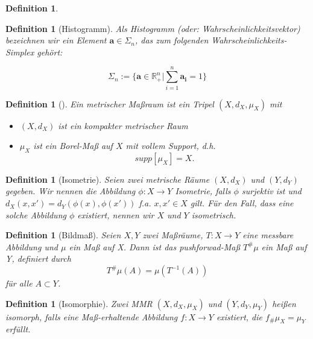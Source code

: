\documentclass[11pt,a4paper]{article}
\def\emph#1{\textit{#1}}
\newtheorem{definition}[theorem]{Definition}
\numberwithin{equation}{section}
\begin{document}
	
	
	\begin{definition}
		
	\end{definition}
	
	\begin{definition}[Histogramm]
		Als Histogramm (oder: Wahrscheinlichkeitsvektor) bezeichnen wir ein Element $\boldsymbol{a} \in \Sigma_n$, das zum folgenden Wahrscheinlichkeits-Simplex gehört:
		
		\begin{equation*}
		\Sigma_n := \lbrace \boldsymbol{a} \in \mathbb{R}_{+}^n | \sum_{i=1}^n{\boldsymbol{a_i} = 1} \rbrace
		\end{equation*}
	\end{definition}
	
	
	\begin{definition}[\cite{gromov2007metric}]
		Ein \emph{metrischer Maßraum} ist ein Tripel $(X,d_X,\mu_X)$ mit
		\begin{itemize}
			\item $(X, d_X)$ ist ein kompakter metrischer Raum
			\item $\mu_X$ ist ein Borel-Maß auf $X$ mit vollem Support, d.h. 
			\begin{equation}
			supp[\mu_X] = X.\label{eq:bed_mmspaces}
			\end{equation} 
		\end{itemize}
	\end{definition}
	
	\begin{definition}[Isometrie]
		Seien zwei metrische Räume $(X, d_X)$ und $(Y,d_Y)$ gegeben. Wir nennen die Abbildung $\phi:X \to Y$ Isometrie, falls $\phi$ surjektiv ist und $d_X(x,x')= d_Y(\phi(x),\phi(x'))$ f.a. $x, x' \in X$ gilt. Für den Fall, dass eine solche Abbildung $\phi$ existiert, nennen wir $X$ und $Y$ isometrisch.
	\end{definition}

	\begin{definition}[Bildmaß]
		Seien $X,Y$ zwei Maßräume, $T: X \to Y$ eine messbare Abbildung und $\mu$ ein Maß auf X. Dann ist das pushforwad-Maß $T^\# \mu $ ein Maß auf Y, definiert durch \begin{equation}
		T^\# \mu (A) = \mu (T^{-1}(A))
		\end{equation}
		für alle $A \subset Y$.
	\end{definition}

	\begin{definition}[Isomorphie]
		Zwei MMR $(X,d_X,\mu_X)$ und $(Y,d_Y,\mu_Y)$ heißen isomorph, falls eine Maß-erhaltende Abbildung $f:X \to Y$ existiert, die $f_\#\mu_X = \mu_Y$ erfüllt.
	\end{definition}
	
\end{document}
